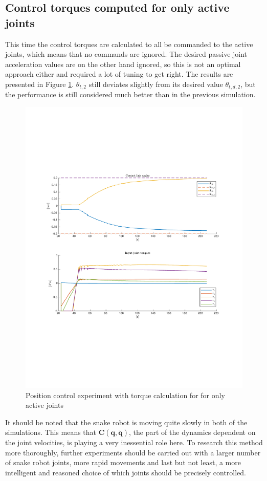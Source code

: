 \subsection{Control torques computed for only active joints}

This time the control torques are calculated to all be commanded to the active joints, which means that no commands are ignored. The desired passive joint acceleration values are on the other hand ignored, so this is not an optimal approach either and required a lot of tuning to get right. The results are presented in Figure \ref{fig:2xp-2}. $\theta_{t,2}$ still deviates slightly from its desired value $\theta_{t,d,2}$, but the performance is still considered much better than in the previous simulation.

\begin{figure}[H]
    \centering
    \includegraphics[trim=2.1cm 6cm 2.1cm 6cm, clip=true, width=\textwidth]{figures/experiments/2xpos/2xpos-2plot.pdf}
    \caption{Position control experiment with torque calculation for for only active joints}
    \label{fig:2xp-2}
\end{figure}

It should be noted that the snake robot is moving quite slowly in both of the simulations. This means that $\mathbf{C(q,\dot{q})}$, the part of the dynamics dependent on the joint velocities, is playing a very inessential role here. To research this method more thoroughly, further experiments should be carried out with a larger number of snake robot joints, more rapid movements and last but not least, a more intelligent and reasoned choice of which joints should be precisely controlled.